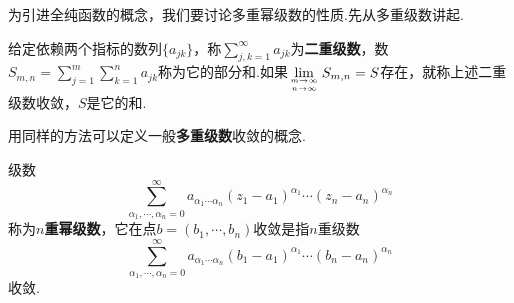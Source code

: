 为引进全纯函数的概念，我们要讨论多重幂级数的性质.先从多重级数讲起.


给定依赖两个指标的数列$\{a_{jk}\}$，称$\sum\limits_{j,k=1}^\infty a_{jk}$为\textbf{二重级数}，数$S_{m,n}=\sum\limits_{j=1}^m \sum\limits_{k=1}^n a_{jk}$称为它的部分和.如果$\lim\limits_{m\to\infty\atop n\to\infty} S_{m,n}=S$存在，就称上述二重级数收敛，$S$是它的和.


用同样的方法可以定义一般\textbf{多重级数}收敛的概念.


级数
\[\sum_{\alpha_1,\cdots,\alpha_n=0}^\infty a_{\alpha_1\cdots\alpha_n}(z_1-a_1)^{\alpha_1}\cdots(z_n-a_n)^{\alpha_n}\]
称为\textbf{$n$重幂级数}，它在点$b=(b_1,\cdots,b_n)$收敛是指$n$重级数
\[\sum_{\alpha_1,\cdots,\alpha_n=0}^\infty a_{\alpha_1\cdots\alpha_n}(b_1-a_1)^{\alpha_1}\cdots(b_n-a_n)^{\alpha_n}\]
收敛.



